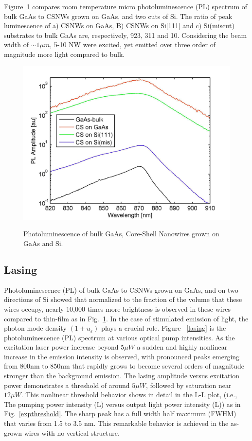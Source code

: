 Figure~\ref{PL} compares room temperature micro photoluminescence (PL) spectrum
of bulk GaAs to CSNWs grown on GaAs, and two cuts of Si. The ratio of peak
luminescence of a) CSNWs on GaAs, B) CSNWs on Si[111] and c) Si(miscut)
substrates to bulk GaAs are, respectively, 923, 311 and 10. Considering the
beam width of $\sim1{\mu}m$, 5-10 NW were excited, yet emitted over three
order of magnitude more light compared to bulk.

\begin{figure}
  \caption{Photoluminescence of bulk GaAs, Core-Shell Nanowires grown on GaAs and Si.}
  \centering
  \includegraphics[width=\textwidth]{pictures/Data/PL}
  \label{PL}
\end{figure}

\subsection{Lasing} \label{data_lasing}

Photoluminescence (PL) of bulk GaAs to CSNWs grown on GaAs, and on two
directions of Si showed that normalized to the fraction of the volume that
these wires occupy, nearly 10,000 times more brightness is observed in these
wires compared to thin-film as in Fig.~\ref{PL}. In the case of stimulated
emission of light, the photon mode density $(1+u_\varepsilon)$ plays a crucial
role. Figure ~\ref{lasing} is the photoluminescence (PL) spectrum at various
optical pump intensities. As the excitation laser power increase beyond
$5{\mu}W$ a sudden and highly nonlinear increase in the emission intensity is
observed, with pronounced peaks emerging from 800nm to 850nm that rapidly grows
to become several orders of magnitude stronger than the background emission.
The lasing amplitude versus excitation power demonstrates a threshold of around
$5{\mu}W$, followed by saturation near $12{\mu}W$. This nonlinear threshold
behavior shows in detail in the L-L plot, (i.e., The pumping power intensity
(L) versus output light power intensity (L)) as in Fig.~\ref{expthreshold}. The
sharp peak has a full width half maximum (FWHM) that varies from 1.5 to 3.5 nm.
This remarkable behavior is achieved in the as-grown wires with no vertical
structure.

